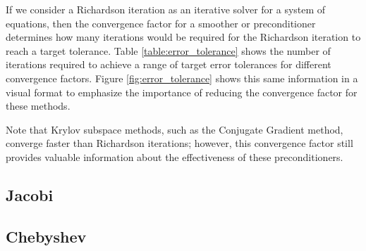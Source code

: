 If we consider a Richardson iteration as an iterative solver for a system of equations, then the convergence factor for a smoother or preconditioner determines how many iterations would be required for the Richardson iteration to reach a target tolerance.
Table \ref{table:error_tolerance} shows the number of iterations required to achieve a range of target error tolerances for different convergence factors.
Figure \ref{fig:error_tolerance} shows this same information in a visual format to emphasize the importance of reducing the convergence factor for these methods.

Note that Krylov subspace methods, such as the Conjugate Gradient method, converge faster than Richardson iterations; however, this convergence factor still provides valuable information about the effectiveness of these preconditioners.

\subsection{Jacobi}


\subsection{Chebyshev}

